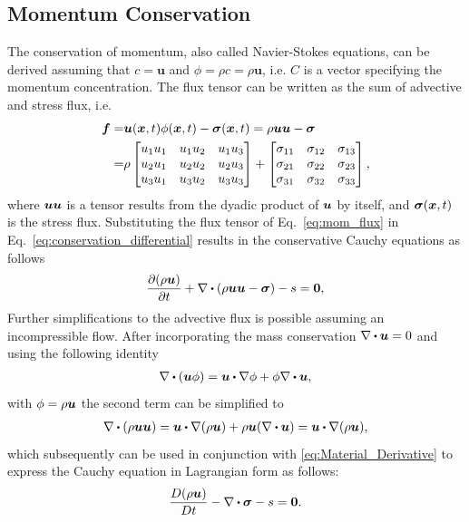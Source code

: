 \subsection{Momentum Conservation}
The conservation of momentum, also called Navier-Stokes equations, can be derived assuming that $c=\mathbf{u}$ and $\phi=\rho c=\rho \mathbf{u}$, i.e. $C$ is a vector specifying the momentum concentration. The flux tensor can be written as the sum of advective and stress flux, i.e. 
\begin{align}
\boldsymbol{f}=& \boldsymbol{u}(\boldsymbol{x},t) \phi(\boldsymbol{x},t) - \bm{\sigma}(\boldsymbol{x},t) =\rho\boldsymbol{u}\boldsymbol{u}-\bm\sigma \nonumber\\
=& \rho\begin{bmatrix}
u_1u_1& u_1u_2& u_1u_3\\
u_2u_1& u_2u_2& u_2u_3\\
u_3u_1& u_3u_2& u_3u_3\\
\end{bmatrix}+
\begin{bmatrix}
\sigma_{11}& \sigma_{12}& \sigma_{13}\\
\sigma_{21}& \sigma_{22}& \sigma_{23}\\
\sigma_{31}& \sigma_{32}& \sigma_{33}\\
\end{bmatrix},
\label{eq:mom_flux}
\end{align}
where $\boldsymbol{u} \boldsymbol{u}$ is a tensor results from the dyadic product of $\boldsymbol{u}$ by itself, and $\bm{\sigma}(\boldsymbol{x},t)$ is the stress flux. Substituting the flux tensor of Eq.~\ref{eq:mom_flux} in Eq.~\ref{eq:conservation_differential} results in the conservative Cauchy equations as follows
\begin{align}
\frac{\partial (\rho \vect{u})  }{\partial t}  + \nabla \bigcdot (\rho \vect{u} \vect{u} -  \bm \sigma) -s=\vect{0},
\label{eq:Momentum_Eu}
\end{align}
Further simplifications to the advective flux is possible assuming an incompressible flow. After incorporating the mass conservation $\nabla\bigcdot \vect{u}=0$ and using the following identity 
\begin{align}
\nabla \bigcdot (\vect{u}\phi)=  \vect{u} \bigcdot \nabla\phi + \phi \nabla \bigcdot \vect{u},\label{eq:identity}
\end{align}
with $\phi=\rho \boldsymbol{u}$ the second term can be simplified to 
\begin{align}\label{eq:non-conservative}
\nabla \bigcdot (\rho\vect{u}\vect{u})=\vect{u} \bigcdot \nabla(\rho\vect{u})+ \rho\vect{u} (\nabla \bigcdot \vect{u})=\vect{u} \bigcdot \nabla(\rho\vect{u}),
\end{align}
which subsequently can be used in conjunction with \ref{eq:Material_Derivative} to express the Cauchy equation in Lagrangian form as follows:
\begin{align}
\frac{ D (\rho \vect{u})  }{D t}  -\nabla \bigcdot  \bm \sigma -s=\vect{0}.
\label{eq:Momentum_La}
\end{align}

